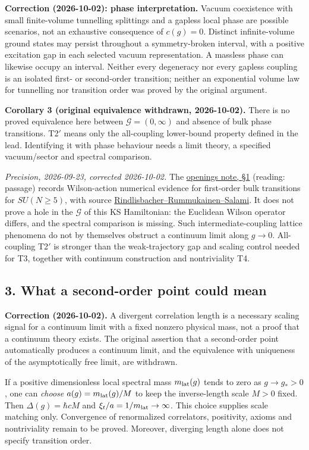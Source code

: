 \documentclass[11pt,a4paper]{article}
\begin{document}
\textbf{Correction (2026-10-02): phase interpretation.} Vacuum
coexistence with small finite-volume tunnelling splittings and a gapless
local phase are possible scenarios, not an exhaustive consequence of
\(c(g)=0\). Distinct infinite-volume ground states may persist
throughout a symmetry-broken interval, with a positive excitation gap in
each selected vacuum representation. A massless phase can likewise
occupy an interval. Neither every degeneracy nor every gapless coupling
is an isolated first- or second-order transition; neither an exponential
volume law for tunnelling nor transition order was proved by the
original argument.

\textbf{Corollary 3 (original equivalence withdrawn, 2026-10-02).} There
is no proved equivalence here between \(\mathcal G=(0,\infty)\) and
absence of bulk phase transitions. T2\('\) means only the all-coupling
lower-bound property defined in the lead. Identifying it with phase
behaviour needs a limit theory, a specified vacuum/sector and spectral
comparison.

\emph{Precision, 2026-09-23, corrected 2026-10-02.} The
\href{mass-gap-openings.md}{openings note, §1} (reading: passage)
records Wilson-action numerical evidence for first-order bulk
transitions for \(SU(N\ge5)\), with source
\href{https://arxiv.org/abs/2306.14319}{Rindlisbacher--Rummukainen--Salami}.
It does not prove a hole in the \(\mathcal G\) of this KS Hamiltonian:
the Euclidean Wilson operator differs, and the spectral comparison is
missing. Such intermediate-coupling lattice phenomena do not by
themselves obstruct a continuum limit along \(g\to0\). All-coupling
T2\('\) is stronger than the weak-trajectory gap and scaling control
needed for T3, together with continuum construction and nontriviality
T4.

\subsection{3. What a second-order point could
mean}\label{what-a-second-order-point-could-mean}

\textbf{Correction (2026-10-02).} A divergent correlation length is a
necessary scaling signal for a continuum limit with a fixed nonzero
physical mass, not a proof that a continuum theory exists. The original
assertion that a second-order point automatically produces a continuum
limit, and the equivalence with uniqueness of the asymptotically free
limit, are withdrawn.

If a positive dimensionless local spectral mass \(m_{\rm lat}(g)\) tends
to zero as \(g\to g_*>0\), one can \emph{choose}
\(a(g)=m_{\rm lat}(g)/M\) to keep the inverse-length scale \(M>0\)
fixed. Then \(\Delta(g)=\hbar cM\) and
\(\xi_t/a=1/m_{\rm lat}\to\infty\). This choice supplies scale matching
only. Convergence of renormalized correlators, positivity, axioms and
nontriviality remain to be proved. Moreover, diverging length alone does
not specify transition order.
\end{document}
